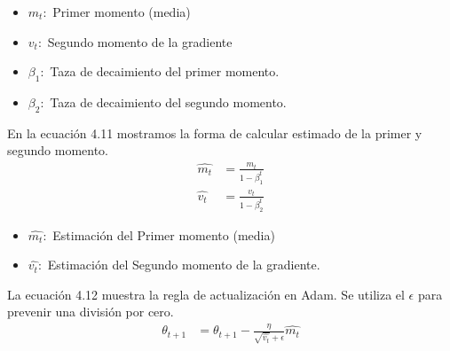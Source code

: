 \begin{itemize}
	\item $m_{t}:$ Primer momento (media)
	\item $v_{t}:$ Segundo momento de la gradiente
	\item $\beta_{1}:$ Taza de decaimiento del primer momento.
	\item $\beta_{2}:$ Taza de decaimiento del segundo momento.
\end{itemize}
En la ecuación 4.11 mostramos la forma de calcular estimado de la primer y segundo momento.
\begin{equation}
\label{adam2}
\begin{aligned}
\hat{m_{t}}&= \frac{m_{t}}{1-\beta_{1}^{t}} \\
\hat{v_{t}} &= \frac{v_{t}}{1-\beta_{2}^{t}}
\end{aligned}
\end{equation}

\begin{itemize}
	\item $\hat{m_{t}}:$ Estimación del Primer momento (media)
	\item $\hat{v_{t}}:$ Estimación del Segundo momento de la gradiente.
\end{itemize}

La ecuación 4.12 muestra la regla de actualización en Adam. Se utiliza el $\epsilon$ para prevenir una división por cero.
\begin{equation}
\label{adam3}
\begin{aligned}
\theta_{t+1}&= \theta_{t+1} - \frac{\eta}{\sqrt{\hat{v_{t}}}+\epsilon} \hat{m_{t}}	
\end{aligned}
\end{equation}

